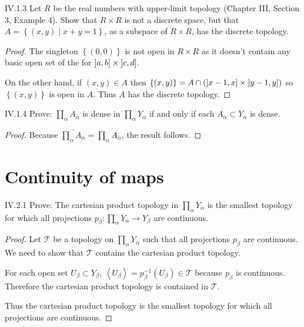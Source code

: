 \begin{problem}{IV.1.3}
Let \( R \) be the real numbers with upper-limit topology (Chapter III, Section 3, Example 4). Show that \( R \times R \) is not a discrete space, but that \( A = \left\{ (x, y) \mid x + y = 1 \right\} \), as a subspace of \( R \times R \), has the discrete topology.
\end{problem}

\begin{proof}
	The singleton \( \left\{ (0, 0) \right\} \) is not open in \( R \times R \) as it doesn't contain any basic open set of the for \( \left\rbrack{a, b}\right\rbrack \times \left\rbrack{c, d}\right\rbrack \).

	On the other hand, if \( (x, y) \in A \) then \( \left\{ (x, y) \right\} = A \cap (\left\rbrack{x - 1, x}\right\rbrack \times \left\rbrack{y - 1, y}\right\rbrack) \) so \( \left\{ (x, y) \right\} \) is open in \( A \). Thus \( A \) has the discrete topology.
\end{proof}

\begin{problem}{IV.1.4}
Prove: \( \prod_{\alpha} A_{\alpha} \) is dense in \( \prod_{\alpha} Y_{\alpha} \) if and only if each \( A_{\alpha} \subset Y_{\alpha} \) is dense.
\end{problem}

\begin{proof}
	Because \( \overline{\prod_{\alpha} A_{\alpha}} = \prod_{\alpha} \overline{A_{\alpha}} \), the result follows.
\end{proof}

\section{Continuity of maps}

\begin{problem}{IV.2.1}
Prove: The cartesian product topology in \( \prod_{\alpha} Y_{\alpha} \) is the smallest topology for which all projections \( p_{\beta}: \prod_{\alpha} Y_{\alpha} \to Y_{\beta} \) are continuous.
\end{problem}

\begin{proof}
	Let \( \mathscr{T} \) be a topology on \( \prod_{\alpha} Y_{\alpha} \) such that all projections \( p_{\beta} \) are continuous. We need to show that \( \mathscr{T} \) contains the cartesian product topology.

	For each open set \( U_{\beta} \subset Y_{\beta} \), \( \left\langle U_{\beta} \right\rangle = p_{\beta}^{-1}(U_{\beta}) \in \mathscr{T} \) because \( p_{\beta} \) is continuous. Therefore the cartesian product topology is contained in \( \mathscr{T} \).

	Thus the cartesian product topology is the smallest topology for which all projections are continuous.
\end{proof}


